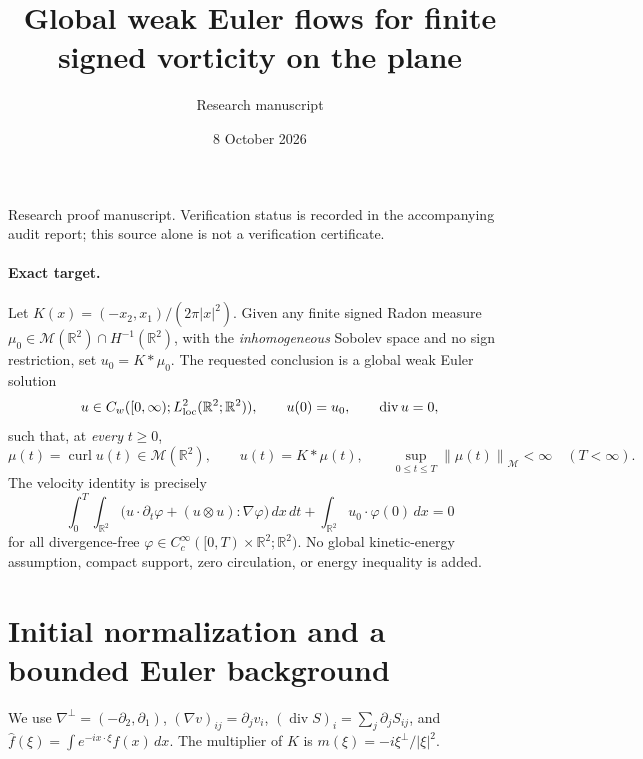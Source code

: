 \documentclass[11pt]{article}
\title{Global weak Euler flows for finite signed vorticity on the plane}
\author{Research manuscript}
\date{8 October 2026}
\theoremstyle{remark}\newtheorem{remark}[theorem]{Remark}
\newcommand{\R}{\mathbb R}
\newcommand{\M}{\mathcal M}
\newcommand{\curl}{\operatorname{curl}}
\newcommand{\Div}{\operatorname{div}}
\newcommand{\norm}[2]{\left\|#1\right\|_{#2}}
\newcommand{\dd}{\,dx}
\begin{document}
\maketitle

\noindent Research proof manuscript.
Verification status is recorded in the accompanying audit report;
this source alone is not a verification certificate.

\paragraph{Exact target.}
Let $K(x)=(-x_2,x_1)/(2\pi|x|^2)$. Given any finite signed Radon measure
$\mu_0\in\M(\R^2)\cap H^{-1}(\R^2)$, with the \emph{inhomogeneous} Sobolev
space and no sign restriction, set $u_0=K*\mu_0$. The requested conclusion is a
global weak Euler solution
\[
 u\in C_w([0,\infty);L^2_{\rm loc}(\R^2;\R^2)),\qquad u(0)=u_0,
 \qquad \Div u=0,
\]
such that, at \emph{every} $t\geq0$,
\[
 \mu(t)=\curl u(t)\in\M(\R^2),\qquad u(t)=K*\mu(t),\qquad
 \sup_{0\leq t\leq T}\norm{\mu(t)}{\M}<\infty\quad(T<\infty).
\]
The velocity identity is precisely
\[
 \int_0^T\!\!\int_{\R^2}
 \bigl(u\cdot\partial_t\varphi+(u\otimes u):\nabla\varphi\bigr)\dd\,dt
 +\int_{\R^2}u_0\cdot\varphi(0)\dd=0
\]
for all divergence-free $\varphi\in C_c^\infty([0,T)\times\R^2;\R^2)$.
No global kinetic-energy assumption, compact support, zero circulation, or
energy inequality is added.

\section{Initial normalization and a bounded Euler background}

We use $\nabla^\perp=(-\partial_2,\partial_1)$,
$(\nabla v)_{ij}=\partial_jv_i$, $(\Div S)_i=\sum_j\partial_jS_{ij}$, and
$\widehat f(\xi)=\int e^{-ix\cdot\xi}f(x)\dd$.
The multiplier of $K$ is $m(\xi)=-i\xi^\perp/|\xi|^2$.
\end{document}
